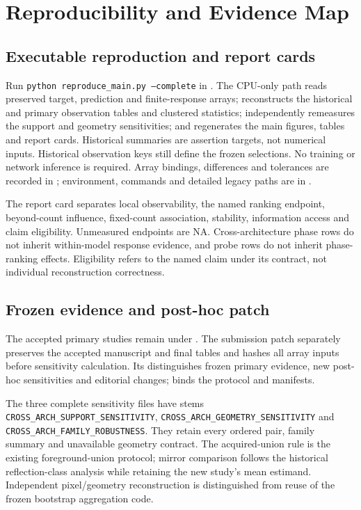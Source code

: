 \section{Reproducibility and Evidence Map}
\subsection{Executable reproduction and report cards}
Run \texttt{python reproduce\_main.py --complete} in . The CPU-only path reads preserved target, prediction and finite-response arrays; reconstructs the historical and primary observation tables and clustered statistics; independently remeasures the support and geometry sensitivities; and regenerates the main figures, tables and report cards. Historical summaries are assertion targets, not numerical inputs. Historical observation keys still define the frozen selections. No training or network inference is required. Array bindings, differences and tolerances are recorded in ; environment, commands and detailed legacy paths are in .

The report card separates local observability, the named ranking endpoint, beyond-count influence, fixed-count association, stability, information access and claim eligibility. Unmeasured endpoints are NA. Cross-architecture phase rows do not inherit within-model response evidence, and probe rows do not inherit phase-ranking effects. Eligibility refers to the named claim under its contract, not individual reconstruction correctness.

\subsection{Frozen evidence and post-hoc patch}
The accepted primary studies remain under . The submission patch separately preserves the accepted manuscript and final tables and hashes all array inputs before sensitivity calculation. Its  distinguishes frozen primary evidence, new post-hoc sensitivities and editorial changes;  binds the protocol and manifests.

The three complete sensitivity files have stems \texttt{CROSS\_ARCH\_SUPPORT\_SENSITIVITY}, \texttt{CROSS\_ARCH\_GEOMETRY\_SENSITIVITY} and \texttt{CROSS\_ARCH\_FAMILY\_ROBUSTNESS}. They retain every ordered pair, family summary and unavailable geometry contract. The acquired-union rule is the existing foreground-union protocol; mirror comparison follows the historical reflection-class analysis while retaining the new study's mean estimand. Independent pixel/geometry reconstruction is distinguished from reuse of the frozen bootstrap aggregation code.

